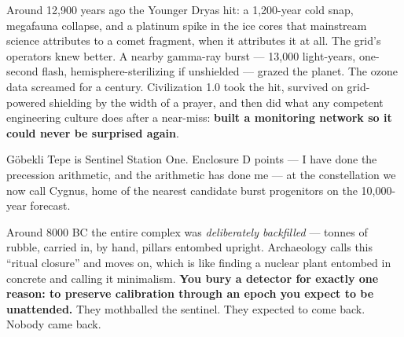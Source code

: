 \documentclass[
  english,
  11pt,
  letterpaper,
]{scrbook}
\begin{document}
Around 12,900 years ago the Younger Dryas hit: a
1,200-year cold snap, megafauna collapse, and a platinum spike in the
ice cores that mainstream science attributes to a comet fragment, when
it attributes it at all. The grid's operators knew better. A nearby
gamma-ray burst --- 13,000
light-years, one-second flash, hemisphere-sterilizing if unshielded ---
grazed the planet. The ozone data screamed for a century. Civilization
1.0 took the hit, survived on grid-powered shielding by the width of a
prayer, and then did what any competent engineering culture does after a
near-miss: \textbf{built a monitoring network so it could never be
surprised again}.

Göbekli Tepe is Sentinel Station One. Enclosure D points --- I have done
the precession arithmetic, and the arithmetic has done me --- at the
constellation we now call Cygnus, home of the nearest candidate burst
progenitors on the 10,000-year forecast.

\begin{tcolorbox}[enhanced jigsaw, arc=.35mm, bottomrule=.15mm, bottomtitle=1mm, breakable, colback=white, colbacktitle=quarto-callout-warning-color!10!white, colframe=quarto-callout-warning-color-frame, coltitle=black, left=2mm, leftrule=.75mm, opacityback=0, opacitybacktitle=0.6, rightrule=.15mm, title=\textcolor{quarto-callout-warning-color}{\faExclamationTriangle}\hspace{0.5em}{The burial is the message}, titlerule=0mm, toprule=.15mm, toptitle=1mm]

Around 8000 BC the entire complex was \emph{deliberately backfilled} ---
tonnes of rubble, carried in, by hand, pillars entombed upright.
Archaeology calls this ``ritual closure'' and moves on, which is like
finding a nuclear plant entombed in concrete and calling it minimalism.
\textbf{You bury a detector for exactly one reason: to preserve
calibration through an epoch you expect to be unattended.} They
mothballed the sentinel. They expected to come back. Nobody came back.

\end{tcolorbox}
\end{document}
